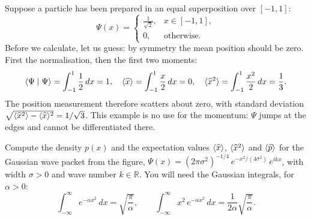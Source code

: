 \begin{example}
	Suppose a particle has been prepared in an equal superposition over $[-1,1]$:
	\begin{equation}
		\Psi(x) = \begin{cases} \frac{1}{\sqrt2}, & x\in[-1,1], \\ 0, & \text{otherwise}. \end{cases}
	\end{equation}
	Before we calculate, let us guess: by symmetry the mean position should be zero. First the normalisation, then the first two moments:
	\begin{equation}
		\langle \Psi \mid \Psi \rangle = \int_{-1}^{1}\frac12\,dx = 1, \quad \langle\widehat{x}\rangle = \int_{-1}^{1}\frac{x}{2}\,dx = 0, \quad \langle\widehat{x}^2\rangle = \int_{-1}^{1}\frac{x^2}{2}\,dx = \frac13.
	\end{equation}
	The position measurement therefore scatters about zero, with standard deviation $\sqrt{\langle\widehat{x}^2\rangle - \langle\widehat{x}\rangle^2} = 1/\sqrt3$. This example is no use for the momentum: $\Psi$ jumps at the edges and cannot be differentiated there.
\end{example}

\begin{exercise}
	Compute the density $p(x)$ and the expectation values $\langle\widehat{x}\rangle$, $\langle\widehat{x}^2\rangle$ and $\langle\widehat{p}\rangle$ for the Gaussian wave packet from the figure,
	$\Psi(x) = (2\pi\sigma^2)^{-1/4}\,e^{-x^2/(4\sigma^2)}\,e^{ikx}$, with width $\sigma>0$ and wave number $k\in\mathbb{R}$. You will need the Gaussian integrals, for $\alpha>0$:
	\begin{equation}\label{eq:gaussintegrale}
		\int_{-\infty}^{\infty} e^{-\alpha x^2}\,dx = \sqrt{\frac{\pi}{\alpha}}, \qquad \int_{-\infty}^{\infty} x^2\,e^{-\alpha x^2}\,dx = \frac{1}{2\alpha}\sqrt{\frac{\pi}{\alpha}}.
	\end{equation}
\end{exercise}
